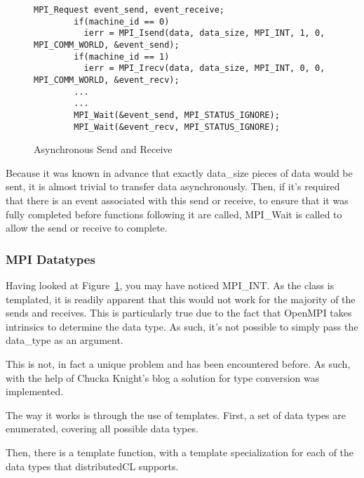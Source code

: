 \documentclass[thesis.tex]{subfiles}
\begin{document}
    \begin{figure}[htbp]
      \centering

      \lstset{language=cpp}  
      \begin{lstlisting}[tabsize=2]
        MPI_Request event_send, event_receive;
        if(machine_id == 0)
          ierr = MPI_Isend(data, data_size, MPI_INT, 1, 0, MPI_COMM_WORLD, &event_send);
        if(machine_id == 1)
          ierr = MPI_Irecv(data, data_size, MPI_INT, 0, 0, MPI_COMM_WORLD, &event_recv);
        ...
        ...
        MPI_Wait(&event_send, MPI_STATUS_IGNORE);
        MPI_Wait(&event_recv, MPI_STATUS_IGNORE);

        \end{lstlisting}

      \caption{Asynchronous Send and Receive}
      \label{fig:async_send_recv}
    \end{figure}

    Because it was known in advance that exactly data\_size pieces of data would be sent, it is almost trivial to transfer data asynchronously. Then, if it's required that there is an event associated with this send or receive, to ensure that it was fully completed before functions following it are called, MPI\_Wait is called to allow the send or receive to complete.


  \subsubsection{MPI Datatypes} %
  \label{ssub:mpi_datatypes}
    Having looked at Figure~\ref{fig:async_send_recv}, you may have noticed MPI\_INT. As the class is templated, it is readily apparent that this would not work for the majority of the sends and receives. This is particularly true due to the fact that OpenMPI takes intrinsics to determine the data type. As such, it's not possible to simply pass the data\_type as an argument.

    This is not, in fact a unique problem and has been encountered before. As such, with the help of Chucka Knight's blog\cite{chuckaknightintrinsictypeconversion} a solution for type conversion was implemented.

    The way it works is through the use of templates. First, a set of data types are enumerated, covering all possible data types.

    Then, there is a template function, with a template specialization for each of the data types that distributedCL supports.
\end{document}
